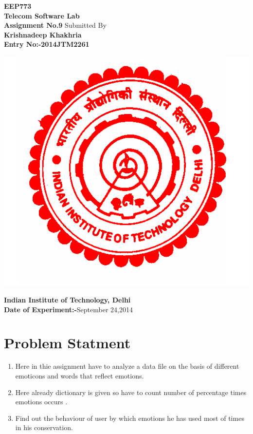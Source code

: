 \documentclass[a4paper,10pt]{report}
\date{}
\begin{document}
\begin{titlepage}
\centering
\vfill
\textbf{\Huge{EEP773
\linebreak
\\Telecom Software Lab}}\\
\vspace{2cm}
\textbf{\Large{Assignment No.9\vskip1cm}}
\vskip2cm
\large{Submitted By}\vskip0.02cm
\Large{\textbf{\\Krishnadeep Khakhria\\
Entry No:-2014JTM2261}}
\vskip1.5cm
\begin{center}
 \includegraphics[bb=0 0 384 360,scale=0.5]{./iitd.png}
\end{center}

\vskip1cm
\textbf{
Indian Institute of Technology, Delhi\\
\vskip0.5cm
Date of Experiment:-}September 24,2014
\vfill
\end{titlepage}

\newpage
\tableofcontents
\newpage
\listoffigures
\newpage
\section{Problem Statment}
\begin{enumerate}
 \item Here in thie assignment have to analyze a data file on the basis of different emoticons and words that reflect emotions.
 \item Here already dictionary is given so have to count number of percentage times emotions occurs .
 \item Find out the behaviour of user by which emotions he has used most  of times  in his conservation.
\end{enumerate}
\end{document}
